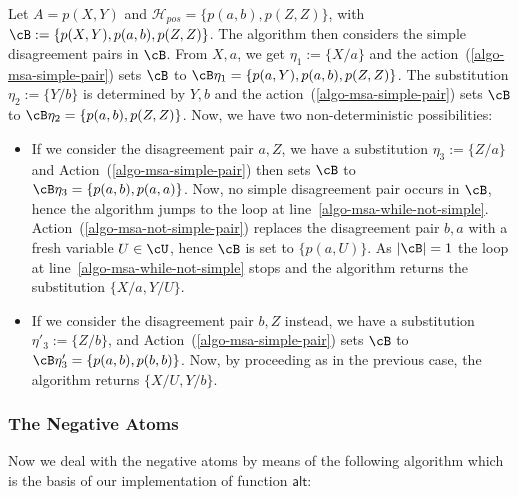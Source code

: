 \documentclass[fleqn]{tlp}
\newcommand{\alt}{\mathsf{alt}}
\newcommand{\Hpos}{\mathcal{H}_{\mathit{pos}}}
\begin{document}
\begin{example}\label{ex-1-g}
  Let $A=p(X,Y)$ and $\Hpos=\{p(a,b),p(Z,Z)\}$, with
  $\cB:=\{p(X,Y),p(a,b),p(Z,Z)\}$. 
  The algorithm then considers
  the simple disagreement pairs in $\cB$. From $X,a$, we get
  $\eta_1:=\{X/a\}$ and the
  action~(\ref{algo-msa-simple-pair}) sets $\cB$ to
    $\cB\eta_1=\{p(a,Y),p(a,b),p(Z,Z)\}$.
   The substitution $\eta_2:=\{Y/b\}$ is determined by $Y,b$ and the
     action~(\ref{algo-msa-simple-pair}) sets $\cB$ to
     $\cB\eta_2=\{p(a,b),p(Z,Z)\}$.
   Now, we have two non-deterministic possibilities:
   \begin{itemize}
   \item If we consider the disagreement pair $a,Z$, we have a
     substitution $\eta_3:=\{Z/a\}$ and
     Action~(\ref{algo-msa-simple-pair}) then sets $\cB$ to
     $\cB\eta_3=\{p(a,b),p(a,a)\}$. Now, no simple disagreement pair
     occurs in $\cB$, hence the algorithm jumps to the loop at
     line~\ref{algo-msa-while-not-simple}.
     Action~(\ref{algo-msa-not-simple-pair}) replaces the disagreement
     pair $b,a$ with a fresh variable $U\in \cU$, hence $\cB$ is set
     to $\{p(a,U)\}$.  As $|\cB|=1$ the loop at
     line~\ref{algo-msa-while-not-simple} stops and the algorithm
     returns the substitution $\{X/a,Y/U\}$.
   \item If we consider the disagreement pair $b,Z$ instead, we have  a
     substitution $\eta'_3:=\{Z/b\}$, and
     Action~(\ref{algo-msa-simple-pair}) sets $\cB$ to
     $\cB\eta'_3=\{p(a,b),p(b,b)\}$. Now, by proceeding as in the
     previous case, the algorithm returns $\{X/U,Y/b\}$.
   \end{itemize}
\end{example}

\subsubsection{The Negative Atoms}
\label{section-algo-all-pos-neg}


Now we deal with the negative atoms 
by means of the following
algorithm which is the basis of our implementation of function
$\alt$:
\end{document}
